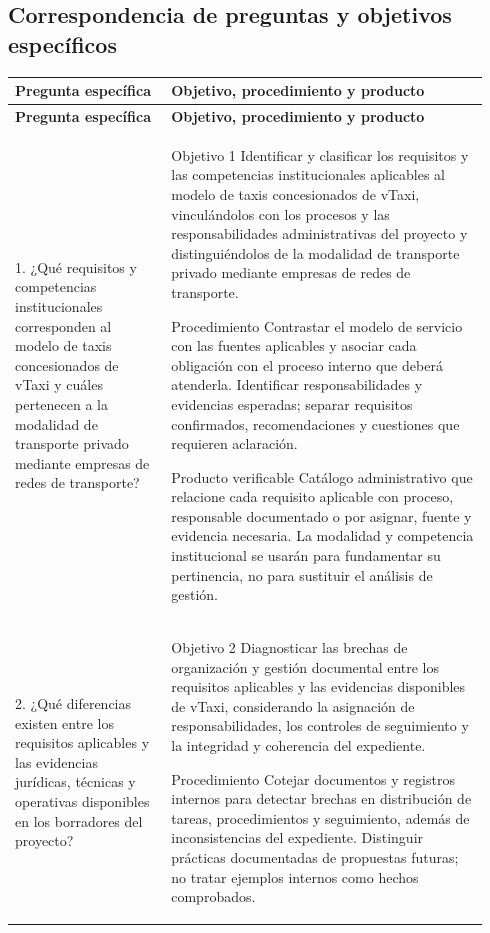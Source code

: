{\begin{landscape}
\subsection*{Correspondencia de preguntas y objetivos específicos}
\begingroup\small{}
\begin{longtable}{@{}p{0.31\linewidth}p{0.63\linewidth}@{}}
\toprule
\textbf{Pregunta específica} & \textbf{Objetivo, procedimiento y producto}\\
\midrule\endfirsthead
\toprule
\textbf{Pregunta específica} & \textbf{Objetivo, procedimiento y producto}\\
\midrule\endhead
1. ¿Qué requisitos y competencias institucionales corresponden al modelo de taxis concesionados de vTaxi y cuáles pertenecen a la modalidad de transporte privado mediante empresas de redes de transporte? & Objetivo 1
Identificar y clasificar los requisitos y las competencias institucionales aplicables al modelo de taxis concesionados de vTaxi, vinculándolos con los procesos y las responsabilidades administrativas del proyecto y distinguiéndolos de la modalidad de transporte privado mediante empresas de redes de transporte.

Procedimiento
Contrastar el modelo de servicio con las fuentes aplicables y asociar cada obligación con el proceso interno que deberá atenderla. Identificar responsabilidades y evidencias esperadas; separar requisitos confirmados, recomendaciones y cuestiones que requieren aclaración.

Producto verificable
Catálogo administrativo que relacione cada requisito aplicable con proceso, responsable documentado o por asignar, fuente y evidencia necesaria. La modalidad y competencia institucional se usarán para fundamentar su pertinencia, no para sustituir el análisis de gestión.\\
\midrule
2. ¿Qué diferencias existen entre los requisitos aplicables y las evidencias jurídicas, técnicas y operativas disponibles en los borradores del proyecto? & Objetivo 2
Diagnosticar las brechas de organización y gestión documental entre los requisitos aplicables y las evidencias disponibles de vTaxi, considerando la asignación de responsabilidades, los controles de seguimiento y la integridad y coherencia del expediente.

Procedimiento
Cotejar documentos y registros internos para detectar brechas en distribución de tareas, procedimientos y seguimiento, además de inconsistencias del expediente. Distinguir prácticas documentadas de propuestas futuras; no tratar ejemplos internos como hechos comprobados.


\end{longtable}
\end{landscape}}
